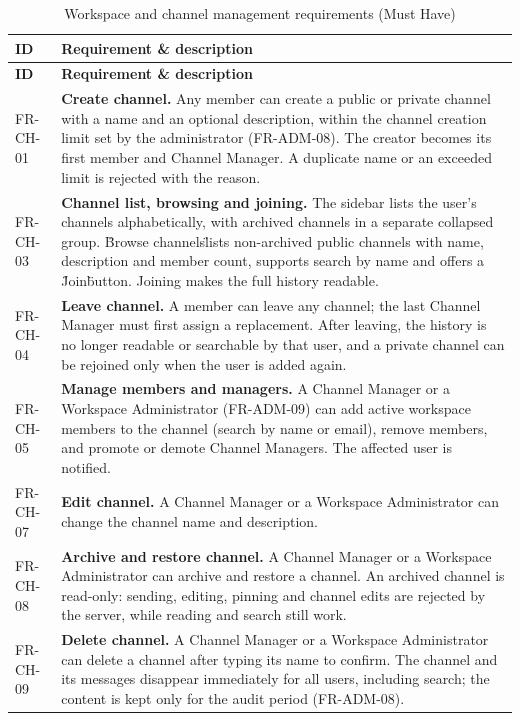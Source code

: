 \documentclass[
    english, %
]{VUMIFPSkursinis}
\newcommand{\frhead}{\textbf{ID} & \textbf{Requirement \& description} \\ \hline}
\begin{document}
\begin{longtable}{|p{}|p{}|}
\caption{Workspace and channel management requirements (Must Have)}\\ \hline
\frhead
\endfirsthead
\hline \frhead
\endhead
FR-CH-01 & \textbf{Create channel.} Any member can create a public or private channel with a name and an optional description, within the channel creation limit set by the administrator (FR-ADM-08). The creator becomes its first member and Channel Manager. A duplicate name or an exceeded limit is rejected with the reason. \\ \hline
FR-CH-03 & \textbf{Channel list, browsing and joining.} The sidebar lists the user's channels alphabetically, with archived channels in a separate collapsed group. \"Browse channels\" lists non-archived public channels with name, description and member count, supports search by name and offers a \"Join\" button. Joining makes the full history readable. \\ \hline
FR-CH-04 & \textbf{Leave channel.} A member can leave any channel; the last Channel Manager must first assign a replacement. After leaving, the history is no longer readable or searchable by that user, and a private channel can be rejoined only when the user is added again. \\ \hline
FR-CH-05 & \textbf{Manage members and managers.} A Channel Manager or a Workspace Administrator (FR-ADM-09) can add active workspace members to the channel (search by name or email), remove members, and promote or demote Channel Managers. The affected user is notified. \\ \hline
FR-CH-07 & \textbf{Edit channel.} A Channel Manager or a Workspace Administrator can change the channel name and description. \\ \hline
FR-CH-08 & \textbf{Archive and restore channel.} A Channel Manager or a Workspace Administrator can archive and restore a channel. An archived channel is read-only: sending, editing, pinning and channel edits are rejected by the server, while reading and search still work. \\ \hline
FR-CH-09 & \textbf{Delete channel.} A Channel Manager or a Workspace Administrator can delete a channel after typing its name to confirm. The channel and its messages disappear immediately for all users, including search; the content is kept only for the audit period (FR-ADM-08). \\ \hline

\end{longtable}
\end{document}
